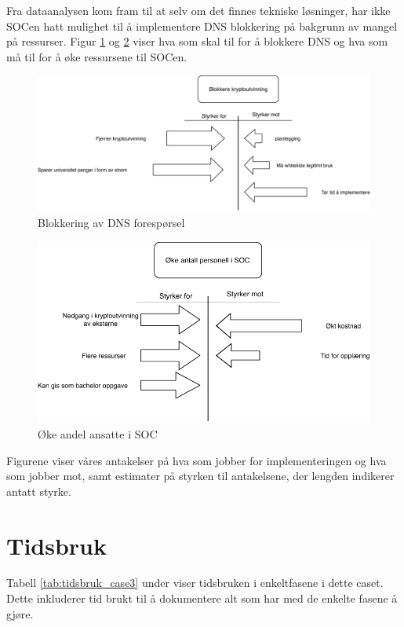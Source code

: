 Fra dataanalysen kom fram til at selv om det finnes tekniske løsninger, har ikke SOCen hatt mulighet til å implementere DNS blokkering på bakgrunn av mangel på ressurser. Figur \ref{fig:Blokkering} og \ref{fig:Oke-antall} viser hva som skal til for å blokkere DNS og hva som må til for å øke ressursene til SOCen.    
 \begin{figure}[H]
    \centering
    \includegraphics[scale=0.6]{case_3/bilder/Force-Field3.pdf}
    \caption[Blokkering]{Blokkering av DNS forespørsel}
    \label{fig:Blokkering}
\end{figure}

 \begin{figure}[H]
    \hspace{3.6cm}
    \includegraphics[scale=0.6]{case_3/bilder/Force-field4.pdf}
    \caption[Øke antall ansette i SOC]{Øke andel ansatte i SOC}
    \label{fig:Oke-antall}
\end{figure}

Figurene viser våres antakelser på hva som jobber for implementeringen og hva som jobber mot, samt estimater på styrken til antakelsene, der lengden indikerer antatt styrke. 
\section{Tidsbruk}
Tabell \ref{tab:tidsbruk_case3} under viser tidsbruken i enkeltfasene i dette caset. Dette inkluderer tid brukt til å dokumentere alt som har med de enkelte fasene å gjøre. 


